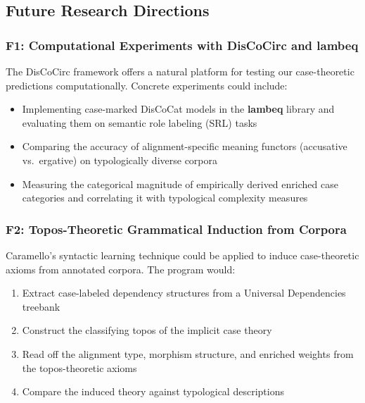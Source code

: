\documentclass[
]{article}
\providecommand{\tightlist}{%
  \setlength{\itemsep}{0pt}\setlength{\parskip}{0pt}}
\numberwithin{equation}{section}
\begin{document}
\subsection{Future Research
Directions}\label{future-research-directions}

\subsubsection{F1: Computational Experiments with DisCoCirc and
lambeq}\label{f1-computational-experiments-with-discocirc-and-lambeq}

The DisCoCirc framework
\citep{defelice2020discourse, defelice2022discocirc} offers a natural
platform for testing our case-theoretic predictions computationally.
Concrete experiments could include:

\begin{itemize}
\tightlist
\item
  Implementing case-marked DisCoCat models in the \textbf{lambeq}
  library \citep{lorenz2023lambeq} and evaluating them on semantic role
  labeling (SRL) tasks
\item
  Comparing the accuracy of alignment-specific meaning functors
  (accusative vs.~ergative) on typologically diverse corpora
\item
  Measuring the categorical magnitude of empirically derived enriched
  case categories and correlating it with typological complexity
  measures
\end{itemize}

\subsubsection{F2: Topos-Theoretic Grammatical Induction from
Corpora}\label{f2-topos-theoretic-grammatical-induction-from-corpora}

Caramello's \citeyearpar{caramello2023syntactic} syntactic learning
technique could be applied to induce case-theoretic axioms from
annotated corpora. The program would:

\begin{enumerate}
\def\labelenumi{\arabic{enumi}.}
\tightlist
\item
  Extract case-labeled dependency structures from a Universal
  Dependencies treebank
\item
  Construct the classifying topos of the implicit case theory
\item
  Read off the alignment type, morphism structure, and enriched weights
  from the topos-theoretic axioms
\item
  Compare the induced theory against typological descriptions
\end{enumerate}
\end{document}
